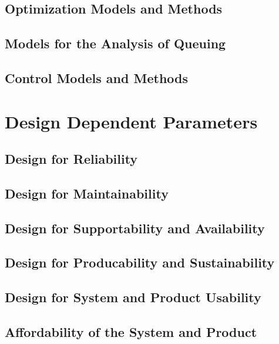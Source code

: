 \documentclass[11pt,fleqn]{book} %
\begin{document}
  \chapter{Optimization Models and Methods}
  
  \chapter{Models for the Analysis of Queuing}
  
  \chapter{Control Models and Methods}
  
\part{Design Dependent Parameters}
  
  \chapter{Design for Reliability}
  
  \chapter{Design for Maintainability}
  
  \chapter{Design for Supportability and Availability}
  
  \chapter{Design for Producability and Sustainability}
  
  \chapter{Design for System and Product Usability}
  
  \chapter{Affordability of the System and Product}
  
\end{document}
